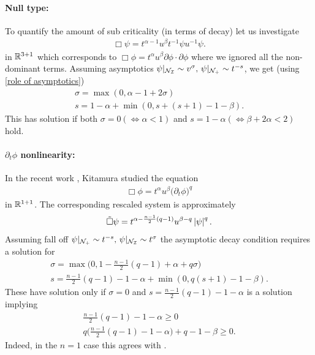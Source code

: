 \documentclass[11pt, oneside]{amsart}
\begin{document}
	\paragraph{Null type:}
	To quantify the amount of sub criticality (in terms of decay) let us investigate
	\begin{equation*}
		\begin{gathered}
			\Box\psi=t^{\alpha-1} u^\beta t^{-1}\psi u^{-1}\psi.
		\end{gathered}
	\end{equation*} 
	in $\mathbb{R}^{3+1}$ which corresponds to $\Box\phi=t^{\alpha}u^{\beta}\partial\phi\cdot\partial\phi$ where we ignored all the non-dominant terms. Assuming asymptotics $\psi|_{\mathcal{N}_{\mathcal{I}}}\sim v^{\sigma},\,\psi|_{\mathcal{N}_+}\sim t^{-s}$, we get (using \cref{role of asymptotics})
	\begin{equation*}
		\begin{gathered}
			\sigma=\max(0,\alpha-1+2\sigma)\\
			s=1-\alpha+\min(0,s+(s+1)-1-\beta).
		\end{gathered}
	\end{equation*}
	This has solution if both $\sigma=0(\iff\alpha<1)$ and $s=1-\alpha(\iff \beta+2\alpha<2)$ hold.
	\paragraph{$\partial_t\phi$ nonlinearity:}
	In the recent work \cite{kitamura_semilinear_2022}, Kitamura studied the equation
	\begin{equation*}
		\begin{gathered}
			\Box\phi=t^\alpha u^\beta \big(\partial_t\phi\big)^q
		\end{gathered}
	\end{equation*}
	in $\mathbb{R}^{1+1}$. The corresponding rescaled system is approximately
	\begin{equation*}
		\begin{gathered}
			\tilde{\Box}\psi=t^{\alpha-\frac{n-1}{2}(q-1)}u^{\beta-q}\left\lvert \psi\right\rvert^q.
		\end{gathered}
	\end{equation*}
	Assuming fall off $\psi|_{\mathcal{N}_+}\sim t^{-s},\, \psi|_{\mathcal{N}_{\mathcal{I}}}\sim t^{\sigma}$ the asymptotic decay condition requires a solution for
	\begin{equation*}
		\begin{gathered}
			\sigma=\max\Big(0,1-\frac{n-1}{2}(q-1)+\alpha+q\sigma\Big)\\
			s=\frac{n-1}{2}(q-1)-1-\alpha+\min(0,q(s+1)-1-\beta).
		\end{gathered}
	\end{equation*}
	These have solution only if $\sigma=0$ and $s=\frac{n-1}{2}(q-1)-1-\alpha$ is a solution implying
	\begin{equation*}
		\begin{gathered}
			\frac{n-1}{2}(q-1)-1-\alpha\geq0\\
			q\bigg(\frac{n-1}{2}(q-1)-1-\alpha\bigg)+q-1-\beta\geq0.
		\end{gathered}
	\end{equation*} 
	Indeed, in the $n=1$ case this agrees with \cite{kitamura_semilinear_2022}.
	
\end{document}

